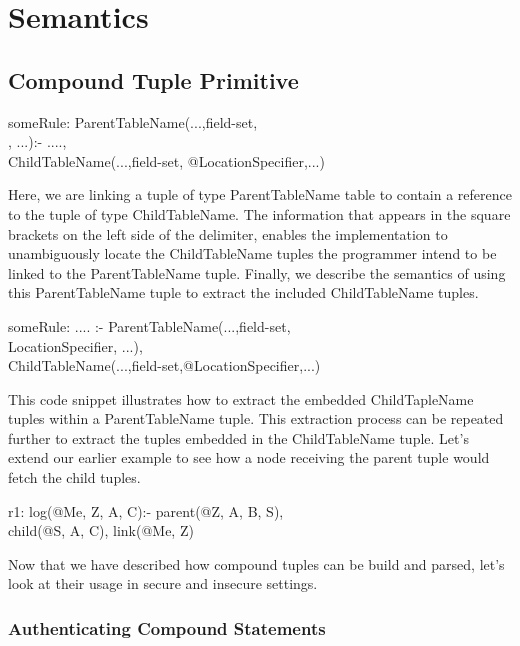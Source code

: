 \section{Semantics}\label{semantics}

\subsection{Compound Tuple Primitive}
\begin{code}
someRule: ParentTableName(...,field-set, \\
, ...):- ....,\\
\> ChildTableName(...,field-set, @LocationSpecifier,...) 
\end{code}

Here, we are linking a tuple of type ParentTableName table to contain a reference to the tuple of type ChildTableName. The information that appears in the square brackets on the left side of the delimiter, enables the implementation to unambiguously locate the ChildTableName tuples the programmer intend to be linked to the ParentTableName tuple. Finally, we describe the semantics of using this ParentTableName tuple to extract the included ChildTableName tuples.

\begin{code}
someRule: .... :- ParentTableName(...,field-set, \\
\> LocationSpecifier, ...), \\
\> ChildTableName(...,field-set,@LocationSpecifier,...) 
\end{code}

This code snippet illustrates how to extract the embedded ChildTapleName tuples within a ParentTableName tuple. This extraction process can be repeated further to extract the tuples embedded in the ChildTableName tuple. Let's extend our earlier example to see how a node receiving the parent tuple would fetch the child tuples.

\begin{code}
r1: log(@Me, Z, A, C):- parent(@Z, A, B, S),\\
\> child(@S, A, C), link(@Me, Z)
\end{code}

Now that we have described how compound tuples can be build and parsed, let's look at their usage in secure and insecure settings.


\subsubsection{Authenticating Compound Statements}

